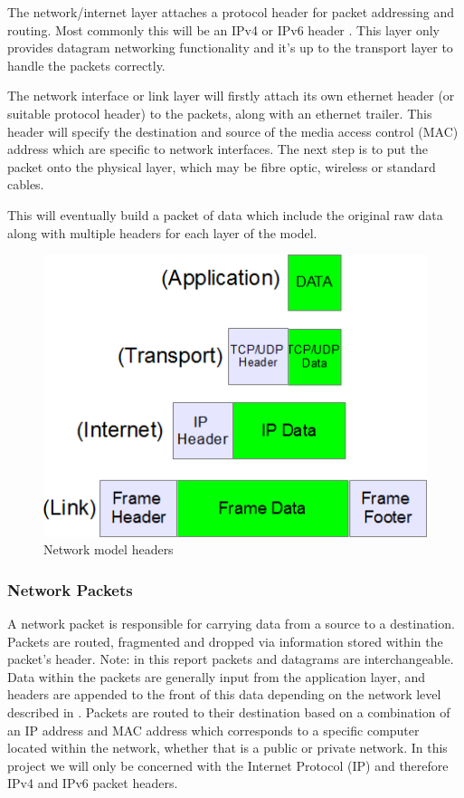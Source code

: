 \documentclass[final_report.tex]{subfiles}
\begin{document}
The network/internet layer attaches a protocol header for packet addressing and routing. Most commonly this will be an IPv4 or IPv6 header . This layer only provides datagram networking functionality and it's up to the transport layer to handle the packets correctly.

The network interface or link layer will firstly attach its own ethernet header (or suitable protocol header) to the packets, along with an ethernet trailer. This header will specify the destination and source of the media access control (MAC) address which are specific to network interfaces. The next step is to put the packet onto the physical layer, which may be fibre optic, wireless or standard cables.

This will eventually build a packet of data which include the original raw data along with multiple headers for each layer of the model. 

\begin{figure}[H]
	\centering
	\includegraphics[width=\textwidth]{img/headers.png}
	\caption{Network model headers \cite{headers}}
	\label{fig:headers}
\end{figure}

\subsubsection{Network Packets}
A network packet is responsible for carrying data from a source to a destination. Packets are routed, fragmented and dropped via information stored within the packet's header. Note: in this report packets and datagrams are interchangeable. Data within the packets are generally input from the application layer, and headers are appended to the front of this data depending on the network level described in . Packets are routed to their destination based on a combination of an IP address and MAC address which corresponds to a specific computer located within the network, whether that is a public or private network. In this project we will only be concerned with the Internet Protocol (IP) and therefore IPv4 and IPv6 packet headers.  
\end{document}
